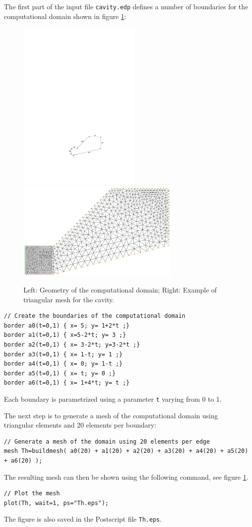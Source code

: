\documentclass[english,3p]{elsarticle}
\newcommand{\code}[1]{\texttt{#1}}
\begin{document}
The first part of the input file \code{cavity.edp} defines a number of boundaries for the computational domain shown in figure \ref{fig:CavityGeometry}:
\begin{figure}[h]
\centering
\includegraphics[width=60mm]{cavity.pdf}
\hfill
\includegraphics[width=80mm]{mesh.eps}
\caption{Left: Geometry of the computational domain; Right: Example of triangular mesh for the cavity.}
\label{fig:CavityGeometry}
\end{figure}
\begin{lstlisting}
// Create the boundaries of the computational domain
border a0(t=0,1) { x= 5; y= 1+2*t ;}
border a1(t=0,1) { x=5-2*t; y= 3 ;} 
border a2(t=0,1) { x= 3-2*t; y=3-2*t ;}
border a3(t=0,1) { x= 1-t; y= 1 ;} 
border a4(t=0,1) { x= 0; y= 1-t ;} 
border a5(t=0,1) { x= t; y= 0 ;} 
border a6(t=0,1) { x= 1+4*t; y= t ;}
\end{lstlisting}
Each boundary is parametrized using a parameter \code{t} varying from 0 to 1.

The next step is to generate a mesh of the computational domain using triangular elements and 20 elements per boundary:
\begin{lstlisting}
// Generate a mesh of the domain using 20 elements per edge
mesh Th=buildmesh( a0(20) + a1(20) + a2(20) + a3(20) + a4(20) + a5(20) + a6(20) );
\end{lstlisting}
The resulting mesh can then be shown using the following command, see figure \ref{fig:CavityGeometry}.
\begin{lstlisting}
// Plot the mesh
plot(Th, wait=1, ps="Th.eps");
\end{lstlisting}
The figure is also saved in the Postscript file \code{Th.eps}.
\end{document}
